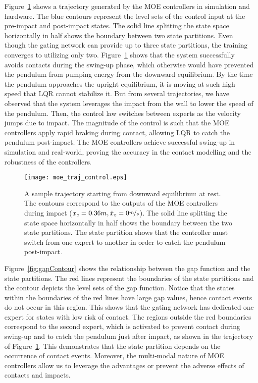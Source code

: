 Figure~\ref{fig:cartpole_trajectory} shows a trajectory generated by the MOE
controllers in simulation and hardware.
%
The blue contours represent the level sets of the control input at the
pre-impact and post-impact states.
%
The solid line splitting the state space horizontally in half shows the boundary
between two state partitions.
%
Even though the gating network can provide up to three state partitions, the
training converges to utilizing only two.
%
Figure~\ref{fig:cartpole_trajectory} shows that the system successfully avoids
contacts during the swing-up phase, which otherwise would have prevented the
pendulum from pumping energy from the downward equilibrium.
%
By the time the pendulum approaches the upright equilibrium, it is moving at
such high speed that LQR cannot stabilize it.
%
But from several trajectories, we have observed that the system leverages the
impact from the wall to lower the speed of the pendulum.
%
Then, the control law switches between experts as the velocity jumps due to impact.
%
The magnitude of the control is such that the MOE controllers apply rapid
braking during contact, allowing LQR to catch the pendulum post-impact.
%
The MOE controllers achieve successful swing-up in simulation and real-world,
proving the accuracy in the contact modelling and the robustness of the
controllers.


\begin{figure}[H]
    \centering
    \texttt{[image: moe\_traj\_control.eps]}
    \caption{A sample trajectory starting from downward equilibrium at rest.
    The contours correspond to the outputs of the MOE controllers during impact
    ($x_c=0.36m, \dot{x}_c = 0\nicefrac{m}{s}$). The solid line
    splitting the state space horizontally in half shows the boundary between
    the two state partitions. The state partition shows that the controller must
    switch from one expert to another in order to catch the pendulum
    post-impact.}
    \label{fig:cartpole_trajectory}
\end{figure}

Figure~\ref{fig:gapContour} shows the relationship between the gap function and
the state partitions.
%
The red lines represent the boundaries of the state partitions and the contour
depicts the level sets of the gap function.
%
Notice that the states within the boundaries of the red lines have large gap
values, hence contact events do not occur in this region.
%
This shows that the gating network has dedicated one expert for states with low
risk of contact.
%
The regions outside the red boundaries correspond to the second expert, which is
activated to prevent contact during swing-up and to catch the pendulum just
after impact, as shown in the trajectory of
Figure~\ref{fig:cartpole_trajectory}.
%
This demonstrates that the state partition depends on the occurrence of contact
events.
%
Moreover, the multi-modal nature of MOE controllers allow us to leverage the
advantages or prevent the adverse effects of contacts and impacts.

